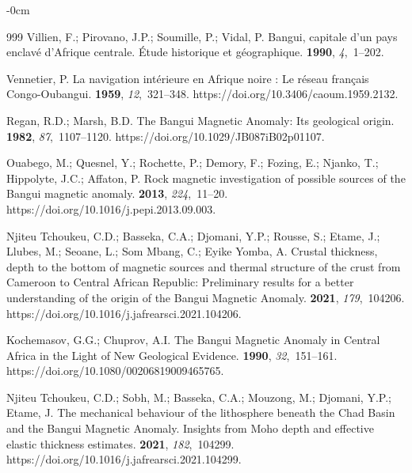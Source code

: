 \documentclass[minerals,article,accept,pdftex,moreauthors]{Definitions/mdpi}
\begin{document}
\begin{adjustwidth}{-\extralength}{0cm}
\begin{thebibliography}{999}
Villien, F.; Pirovano, J.P.; Soumille, P.; Vidal, P.
\newblock Bangui, capitale d'un pays enclavé d'Afrique centrale. Étude
  historique et géographique.
 {\bf 1990}, {\em 4},~1--202.

Vennetier, P.
\newblock La navigation intérieure en Afrique noire : Le réseau français
  Congo-Oubangui.
 {\bf 1959}, {\em 12},~321--348.
\newblock https://doi.org/10.3406/caoum.1959.2132.

Regan, R.D.; Marsh, B.D.
\newblock The Bangui Magnetic Anomaly: Its geological origin.
 {\bf 1982}, {\em
  87},~1107--1120.
\newblock https://doi.org/10.1029/JB087iB02p01107.

Ouabego, M.; Quesnel, Y.; Rochette, P.; Demory, F.; Fozing, E.; Njanko, T.;
  Hippolyte, J.C.; Affaton, P.
\newblock Rock magnetic investigation of possible sources of the Bangui
  magnetic anomaly.
 {\bf 2013}, {\em
  224},~11--20.
\newblock https://doi.org/10.1016/j.pepi.2013.09.003.

{Njiteu Tchoukeu}, C.D.; Basseka, C.A.; Djomani, Y.P.; Rousse, S.; Etame, J.;
  Llubes, M.; Seoane, L.; {Som Mbang}, C.; {Eyike Yomba}, A.
\newblock Crustal thickness, depth to the bottom of magnetic sources and
  thermal structure of the crust from Cameroon to Central African Republic:
  Preliminary results for a better understanding of the origin of the Bangui
  Magnetic Anomaly.
 {\bf 2021}, {\em
  179},~104206.
\newblock https://doi.org/10.1016/j.jafrearsci.2021.104206.

Kochemasov, G.G.; Chuprov, A.I.
\newblock The Bangui Magnetic Anomaly in Central Africa in the Light of New
  Geological Evidence.
 {\bf 1990}, {\em 32},~151--161.
\newblock https://doi.org/10.1080/00206819009465765.

{Njiteu Tchoukeu}, C.D.; Sobh, M.; Basseka, C.A.; Mouzong, M.; Djomani, Y.P.;
  Etame, J.
\newblock The mechanical behaviour of the lithosphere beneath the Chad Basin
  and the Bangui Magnetic Anomaly. Insights from Moho depth and effective
  elastic thickness estimates.
 {\bf 2021}, {\em
  182},~104299.
\newblock https://doi.org/10.1016/j.jafrearsci.2021.104299.


\end{thebibliography}
\end{adjustwidth}
\end{document}
